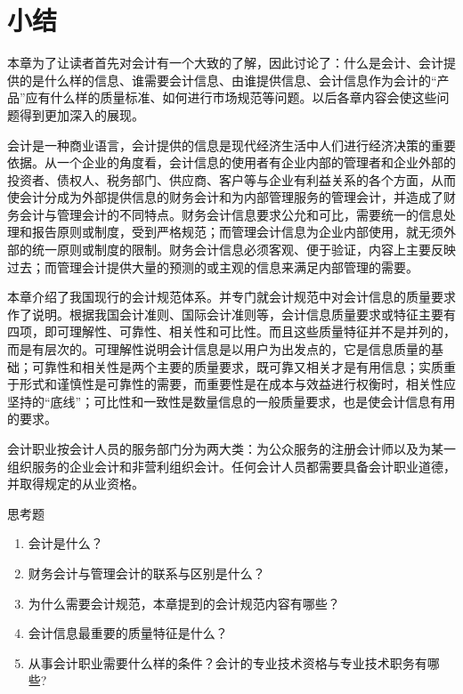 			\section{小结}

			本章为了让读者首先对会计有一个大致的了解，因此讨论了：什么是会计、会计提供的是什么样的信息、谁需要会计信息、由谁提供信息、会计信息作为会计的“产品”应有什么样的质量标准、如何进行市场规范等问题。以后各章内容会使这些问题得到更加深入的展现。
			
			会计是一种商业语言，会计提供的信息是现代经济生活中人们进行经济决策的重要依据。从一个企业的角度看，会计信息的使用者有企业内部的管理者和企业外部的投资者、债权人、税务部门、供应商、客户等与企业有利益关系的各个方面，从而使会计分成为外部提供信息的财务会计和为内部管理服务的管理会计，并造成了财务会计与管理会计的不同特点。财务会计信息要求公允和可比，需要统一的信息处理和报告原则或制度，受到严格规范；而管理会计信息为企业内部使用，就无须外部的统一原则或制度的限制。财务会计信息必须客观、便于验证，内容上主要反映过去；而管理会计提供大量的预测的或主观的信息来满足内部管理的需要。
			
			本章介绍了我国现行的会计规范体系。并专门就会计规范中对会计信息的质量要求作了说明。根据我国会计准则、国际会计准则等，会计信息质量要求或特征主要有四项，即可理解性、可靠性、相关性和可比性。而且这些质量特征并不是并列的，而是有层次的。可理解性说明会计信息是以用户为出发点的，它是信息质量的基础；可靠性和相关性是两个主要的质量要求，既可靠又相关才是有用信息；实质重于形式和谨慎性是可靠性的需要，而重要性是在成本与效益进行权衡时，相关性应坚持的“底线”；可比性和一致性是数量信息的一般质量要求，也是使会计信息有用的要求。
			
			会计职业按会计人员的服务部门分为两大类：为公众服务的注册会计师以及为某一组织服务的企业会计和非营利组织会计。任何会计人员都需要具备会计职业道德，并取得规定的从业资格。 

			{\heiti 思考题}

			\begin{enumerate}
				\item 会计是什么？
				\item 财务会计与管理会计的联系与区别是什么？
				\item 为什么需要会计规范，本章提到的会计规范内容有哪些？
				\item 会计信息最重要的质量特征是什么？
				\item 从事会计职业需要什么样的条件？会计的专业技术资格与专业技术职务有哪些?
			\end{enumerate}
